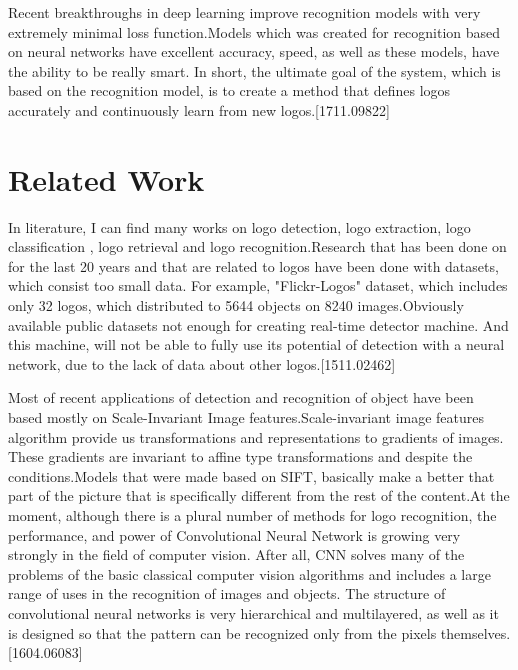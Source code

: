 \vspace{-0.5cm}
\par Recent breakthroughs in deep learning improve recognition models with very extremely minimal loss function.Models which was created for recognition based on neural networks have excellent accuracy, speed, as well as these models, have the ability to be really smart. In short, the ultimate goal of the system, which is based on the recognition model, is to create a method that defines logos accurately and continuously learn from new logos.[1711.09822]

\vspace{-0.3cm}
\section{Related Work}\label{sec:1.2}
\vspace{-0.5cm}
\noindent In literature, I can find many works on logo detection, logo extraction, logo classification , logo retrieval and logo recognition.Research that has been done on for the last 20 years and that are related to logos have been done with datasets, which consist too small data. For example, "Flickr-Logos" dataset, which includes only 32 logos, which distributed to 5644 objects on 8240 images.Obviously available public datasets not enough for creating real-time detector machine. And this machine, will not be able to fully use its potential of detection with a neural network, due to the lack of data about other logos.[1511.02462]

\vspace{-0.3cm}
\par Most of recent applications of detection and recognition of object have been based mostly on Scale-Invariant Image features.Scale-invariant image features algorithm provide us transformations and representations to gradients of images. These gradients are invariant to affine type transformations and despite the conditions.Models that were made based on SIFT, basically make a better that part of the picture that is specifically different from the rest of the content.At the moment, although there is a plural number of methods for logo recognition, the performance, and power of Convolutional Neural Network is growing very strongly in the field of computer vision. After all, CNN solves many of the problems of the basic classical computer vision algorithms and includes a large range of uses in the recognition of images and objects. The structure of convolutional neural networks is very hierarchical and multilayered, as well as it is designed so that the pattern can be recognized only from the pixels themselves.[1604.06083]


